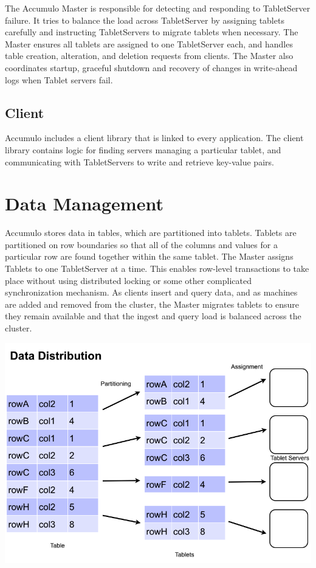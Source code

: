 The Accumulo Master is responsible for detecting and responding to TabletServer
failure. It tries to balance the load across TabletServer by assigning tablets carefully
and instructing TabletServers to migrate tablets when necessary. The Master ensures all
tablets are assigned to one TabletServer each, and handles table creation, alteration,
and deletion requests from clients. The Master also coordinates startup, graceful
shutdown and recovery of changes in write-ahead logs when Tablet servers fail.

\subsection{Client}

Accumulo includes a client library that is linked to every application. The client
library contains logic for finding servers managing a particular tablet, and
communicating with TabletServers to write and retrieve key-value pairs.

\section{Data Management}

Accumulo stores data in tables, which are partitioned into tablets. Tablets are
partitioned on row boundaries so that all of the columns and values for a particular
row are found together within the same tablet. The Master assigns Tablets to one
TabletServer at a time. This enables row-level transactions to take place without
using distributed locking or some other complicated synchronization mechanism. As
clients insert and query data, and as machines are added and removed from the
cluster, the Master migrates tablets to ensure they remain available and that the
ingest and query load is balanced across the cluster.

\begin{center}
\includegraphics[scale=0.4]{images/data_distribution.png}
\end{center}

